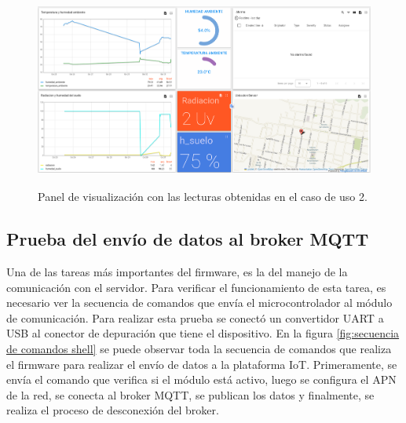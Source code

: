 \begin{figure}[h!]
  \centering
    \includegraphics[width=\linewidth, height=6.5cm]{./Figures/humedad_alta_tb.png}
  \caption{Panel de visualización con las lecturas obtenidas en el caso de uso 2.}
    \label{fig:Humedad alta ThingsBoard}
\end{figure}

\subsection{Prueba del envío de datos al broker MQTT}
Una de las tareas más importantes del firmware, es la del manejo de la comunicación con el servidor. Para verificar el funcionamiento de esta tarea, es necesario ver la secuencia de comandos que envía el microcontrolador al módulo de comunicación.
Para realizar esta prueba se conectó un convertidor UART a USB al conector de depuración que tiene el dispositivo.
En la figura \ref{fig:secuencia de comandos shell} se puede observar toda la secuencia de comandos que realiza el firmware para realizar el envío de datos a la plataforma IoT. Primeramente, se envía el comando que verifica si el módulo está activo, luego se configura el APN de la red, se conecta al broker MQTT, se publican los datos y finalmente, se realiza el proceso de desconexión del broker.

